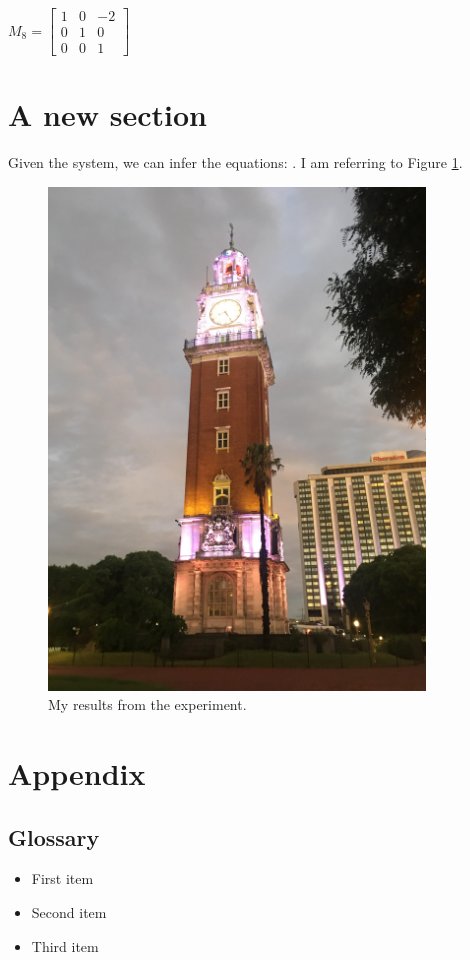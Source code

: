 \documentclass[12pt]{article}
\begin{document}
$M_{8} = 
\begin{bmatrix}
1 & 0 & -2 \\ 
0 & 1 & 0 \\ 
0 & 0 & 1
\end{bmatrix}\
$

\section{A new section}

Given the system, we can infer the equations: \citep{Ref1}. I am referring to Figure \ref{fig:colormap}.

\begin{figure}[!h]
\centering
\includegraphics[width=100mm,scale=1]{image.jpg}
\caption{My results from the experiment.}
\label{fig:colormap}
\end{figure}

\section{Appendix}

\subsection{Glossary}

\begin{itemize}
\item First item
\item Second item
\item Third item
\end{itemize}
\end{document}
